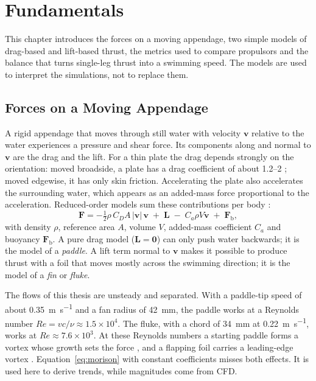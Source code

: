 \chapter{Fundamentals}
\label{ch:foundations}

This chapter introduces the forces on a moving appendage, two simple models of drag-based and lift-based
thrust, the metrics used to compare propulsors and the balance that turns single-leg thrust into a swimming
speed. The models are used to interpret the simulations, not to replace them.

\section{Forces on a Moving Appendage}
\label{sec:fund-forces}

A rigid appendage that moves through still water with velocity $\bm v$ relative to the water experiences a
pressure and shear force. Its components along and normal to $\bm v$ are the drag and the lift. For a
thin plate the drag depends strongly on the orientation: moved broadside, a plate has a drag coefficient of
about 1.2--2 \cite{Newman1977}; moved edgewise, it has only skin friction. Accelerating the plate also
accelerates the surrounding water, which appears as an added-mass force proportional to the acceleration.
Reduced-order models sum these contributions per body \cite{Morison1950,Fossen1994}:
\begin{equation}
  \bm F = -\tfrac12\rho\, C_D A\, |\bm v|\,\bm v \;+\; \bm L \;-\; C_a \rho V \dot{\bm v} \;+\; \bm F_\text{b},
  \label{eq:morison}
\end{equation}
with density $\rho$, reference area $A$, volume $V$, added-mass coefficient $C_a$ and buoyancy
$\bm F_\text{b}$. A pure drag model ($\bm L=\bm 0$) can only push water backwards; it is the model of a
\emph{paddle}. A lift term normal to $\bm v$ makes it possible to produce thrust with a foil that moves
mostly across the swimming direction; it is the model of a \emph{fin} or \emph{fluke}.

The flows of this thesis are unsteady and separated. With a paddle-tip speed of about
\SI{0.35}{\metre\per\second} and a fan radius of \SI{42}{\milli\metre}, the paddle works at a Reynolds number
$\mathit{Re}=vc/\nu\approx1.5\times10^4$. The fluke, with a chord of \SI{34}{\milli\metre} at
\SI{0.22}{\metre\per\second}, works at $\mathit{Re}\approx7.6\times10^3$. At these Reynolds numbers a starting
paddle forms a vortex whose growth sets the force \cite{Kim2011}, and a flapping foil carries a leading-edge
vortex \cite{Triantafyllou1991,Anderson1998}. Equation~\eqref{eq:morison} with constant coefficients misses both
effects. It is used here to derive trends, while magnitudes come from CFD.

